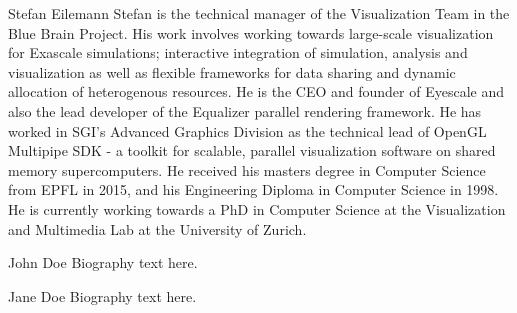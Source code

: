 \documentclass[10pt,journal,compsoc]{IEEEtran}
\begin{document}
\begin{IEEEbiography}{Stefan Eilemann}
Stefan is the technical manager of the Visualization Team in the Blue Brain
Project. His work involves working towards large-scale visualization for
Exascale simulations; interactive integration of simulation, analysis and
visualization as well as flexible frameworks for data sharing and dynamic
allocation of heterogenous resources. He is the CEO and founder of Eyescale and
also the lead developer of the Equalizer parallel rendering framework. He has
worked in SGI's Advanced Graphics Division as the technical lead of OpenGL
Multipipe SDK - a toolkit for scalable, parallel visualization software on
shared memory supercomputers. He received his masters degree in Computer Science
from EPFL in 2015, and his Engineering Diploma in Computer Science in 1998. He
is currently working towards a PhD in Computer Science at the Visualization and
Multimedia Lab at the University of Zurich.
\end{IEEEbiography}

\begin{IEEEbiographynophoto}{John Doe}
Biography text here.
\end{IEEEbiographynophoto}


\begin{IEEEbiographynophoto}{Jane Doe}
Biography text here.
\end{IEEEbiographynophoto}




\end{document}
